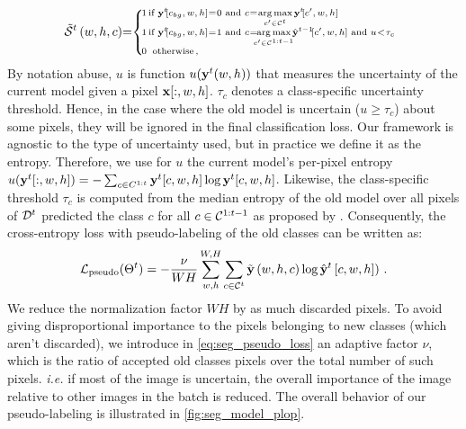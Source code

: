 \begin{equation}
    \scriptsize
    \tilde \mcS^{t}\left(w,h,c\right)\mkern-5mu = \mkern-5mu \left\{\begin{array}{ll}
        \mkern-14mu 1 \mkern-27mu & \mkern-8mu \text { if } \vy^{t} \mkern-4mu [c_{bg},w,h]\mkern-4mu = \mkern-4mu 0 \text { and } c \mkern-4mu = \mkern-4mu \argmax \limits_{c' \in \mcC^{t}} \vy^{t} \mkern-4mu [c',w,h]                                                                          \\
        \mkern-14mu 1 \mkern-27mu & \mkern-8mu \text { if } \vy^{t} \mkern-4mu [c_{bg},w,h] \mkern-4mu = \mkern-4mu 1 \text { and } c \mkern-4mu = \mkern-12mu \argmax \limits_{c' \in \mcC^{1:t-1}} \mkern-6mu \hat \vy^{t-1} \mkern-4mu [c',w,h]  \text{ and } u \mkern-4mu < \mkern-4mu \tau_{c} \\
        \mkern-14mu 0 \mkern-27mu & \mkern-4mu \,\text { otherwise\,, }                                                                                                                                                                                                                             \\
    \end{array}\right.
    \label{eq:seg_pseudo_bis_uncertain}
\end{equation}
%
By notation abuse, $u$ is function $u(\mathbf{y}^t(w, h))$ that measures the uncertainty of the current
model given a pixel $\mathbf{x}[:,w,h]$. $\tau_{c}$ denotes a class-specific uncertainty threshold. Hence,
in the case where the old model is uncertain ($u \ge \tau_c$) about some pixels, they will be
ignored in the final classification loss. Our framework is agnostic to the type of uncertainty used,
but in practice we define it as the entropy. Therefore, we use for $u$ the current model's per-pixel
entropy $u(\mathbf{y}^t[:,w, h]) = -\sum_{c \in C^{1:t}} \mathbf{y}^t[c,w, h] \log \mathbf{y}^t[c,w, h]$. Likewise,
the class-specific threshold $\tau_c$ is computed from the median entropy of the old model over all
pixels of $\mathcal{D}^t$ predicted the class $c$ for all $c \in \mathcal{C}^{1:t-1}$ as proposed by
\cite{saporta2020esl}. Consequently, the cross-entropy loss with pseudo-labeling of the old classes
can be written as:
%
\begin{equation}
    \mathcal{L}_\text{pseudo}(\Theta^t)=- \frac{\nu}{WH} \sum_{w,h}^{W,H} \sum_{c \in \mathcal{C}^{t}} \tilde {\mathbf{y}}\left(w,h,c\right) \log \hat {\mathbf{y}}^{t}\left[c,w,h]\right)\,.
    \label{eq:seg_pseudo_loss}
\end{equation}
%
We reduce the normalization factor $WH$ by as much discarded pixels. To avoid giving disproportional
importance to the pixels belonging to new classes (which aren't discarded), we introduce in
\autoref{eq:seg_pseudo_loss} an adaptive factor $\nu$, which is the ratio of accepted old classes
pixels over the total number of such pixels. \textit{i.e.} if most of the image is uncertain, the
overall importance of the image relative to other images in the batch is reduced. The overall
behavior of our pseudo-labeling is illustrated in \autoref{fig:seg_model_plop}.

